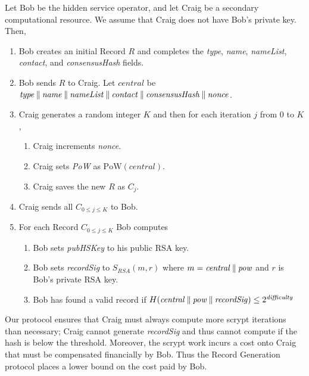 Let Bob be the hidden service operator, and let Craig be a secondary computational resource. We assume that Craig does not have Bob's private key. Then,

\begin{enumerate}
	\item Bob creates an initial Record $ R $ and completes the \emph{type}, \emph{name}, \emph{nameList}, \emph{contact}, and \emph{consensusHash} fields.
	\item Bob sends $ R $ to Craig. Let $ \mathit{central} $ be $\mathit{type} \mathbin{\|} \mathit{name} \mathbin{\|} \mathit{nameList} \mathbin{\|} \mathit{contact} \mathbin{\|} \mathit{consensusHash} \mathbin{\|} \mathit{nonce} $.
	\item Craig generates a random integer $ K $ and then for each iteration $ j $ from 0 to $ K $,
		\begin{enumerate}
			\item Craig increments \emph{nonce}.
			\item Craig sets \emph{PoW} as $ \mathrm{PoW}(\mathit{central}) $.
			\item Craig saves the new $ R $ as $ C_{j} $.
		\end{enumerate}
	\item Craig sends all $ C_{0 \le j \le K} $ to Bob.
	\item For each Record $ C_{0 \le j \le K} $ Bob computes
		\begin{enumerate}
			\item Bob sets \emph{pubHSKey} to his public RSA key.
			\item Bob sets \emph{recordSig} to $ S_{\mathit{RSA}}(m, r) $ where $ m = \mathit{central} \mathbin{\|} \mathit{pow} $ and $ r $ is Bob's private RSA key.
			\item Bob has found a valid record if $ H(\mathit{central} \mathbin{\|} \mathit{pow} \mathbin{\|} \mathit{recordSig}) \leq 2^{\mathit{difficulty}} $
		\end{enumerate}
\end{enumerate}


Our protocol ensures that Craig must always compute more scrypt iterations than necessary; Craig cannot generate \emph{recordSig} and thus cannot compute if the hash is below the threshold. Moreover, the scrypt work incurs a cost onto Craig that must be compensated financially by Bob. Thus the Record Generation protocol places a lower bound on the cost paid by Bob.

